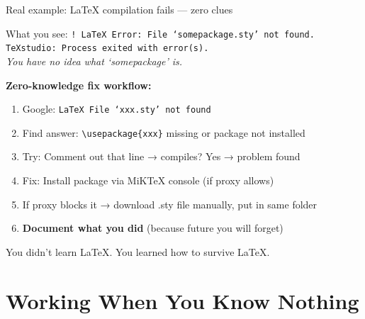 \documentclass[aspectratio=169, 11pt]{beamer}
\begin{document}
	\begin{frame}{Real example: LaTeX compilation fails — zero clues}
		\begin{block}{What you see:}
			\small{\texttt{! LaTeX Error: File `somepackage.sty' not found.}} \\
			\vspace{0.1cm}
			\small{\texttt{TeXstudio: Process exited with error(s).}} \\
			\vspace{0.1cm}
			\small{\textit{You have no idea what `somepackage' is.}}
		\end{block}
		\vspace{0.2cm}
		\textbf{Zero-knowledge fix workflow:}
		\begin{enumerate}
			\item Google: \texttt{LaTeX File `xxx.sty' not found}
			\item Find answer: \texttt{\textbackslash usepackage\{xxx\}} missing or package not installed
			\item Try: Comment out that line → compiles? Yes → problem found
			\item Fix: Install package via MiKTeX console (if proxy allows)
			\item If proxy blocks it → download .sty file manually, put in same folder
			\item \textbf{Document what you did} (because future you will forget)
		\end{enumerate}
		\vspace{0.1cm}
		\alert{You didn't learn LaTeX. You learned how to survive LaTeX.}
	\end{frame}
	
	
	\section{Working When You Know Nothing}
	
\end{document}
